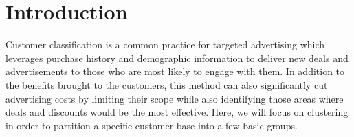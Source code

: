 \documentclass[12pt]{article}
\title{}
\author{}
\date{}
\begin{document}








\section*{Introduction}


Customer classification is a common practice for targeted advertising which leverages purchase history and demographic information to deliver new deals and advertisements to those who are most likely to engage with them. In addition to the benefits brought to the customers, this method can also significantly cut advertising costs by limiting their scope while also identifying those areas where deals and discounts would be the most effective. Here, we will focus on clustering in order to partition a specific customer base into a few basic groups. 

\end{document}
